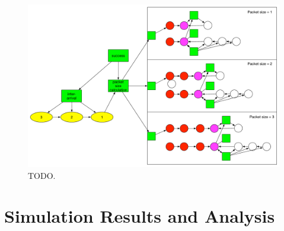 \documentclass{llncs}
\begin{document}
\begin{figure}
\begin{center}
\includegraphics[scale=0.35]{../../sketches/compressible_dcf_all.pdf}
\caption{TODO.}
\label{fig:compressible_dcf_all}
\end{center}
\end{figure}

\section{Simulation Results and Analysis}






\end{document}
